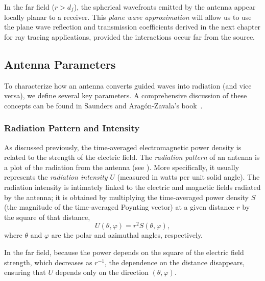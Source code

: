In the \gls{far field} ($r > d_f$), the spherical wavefronts emitted by the antenna appear locally planar to a receiver. This \emph{plane wave approximation} will allow us to use the plane wave reflection and transmission coefficients derived in the next chapter for ray tracing applications, provided the interactions occur far from the source.

\subsection{Antenna Parameters}

\begin{marginfigure}
  \centering
  \caption{Example of a  radiation pattern for a directional antenna.}
\end{marginfigure}

To characterize how an antenna converts guided waves into  radiation (and vice versa), we define several key parameters. A comprehensive discussion of these concepts can be found in Saunders and Aragón-Zavala's book~.

\subsubsection{Radiation Pattern and Intensity}

As discussed previously, the time-averaged electromagnetic power density is related to the strength of the electric field. The \emph{radiation pattern} of an antenna is a plot of the  radiation from the antenna (see ). More specifically, it usually represents the \emph{radiation intensity} $U$ (measured in watts per unit solid angle). The radiation intensity is intimately linked to the electric and magnetic fields radiated by the antenna; it is obtained by multiplying the time-averaged power density $S$ (the magnitude of the time-averaged Poynting vector) at a given distance $r$ by the square of that distance,
\begin{equation}
  U(\theta, \varphi) = r^2 S(\theta, \varphi),
\end{equation}
where $\theta$ and $\varphi$ are the polar and azimuthal angles, respectively.

In the \gls{far field}, because the power depends on the square of the electric field strength, which decreases as $r^{-1}$, the dependence on the distance disappears, ensuring that $U$ depends only on the direction $(\theta, \varphi)$.

